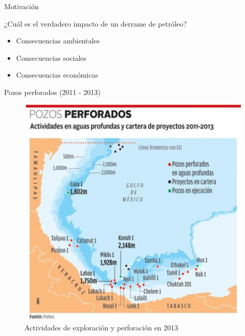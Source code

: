 \begin{frame}{Motivación}
  \begin{block}{¿Cuál es el verdadero impacto de un derrame de petróleo?}
    \begin{itemize}
      \item Consecuencias ambientales
      \item Consecuencias sociales
      \item Consecuencias económicas
    \end{itemize}
  \end{block}

\end{frame}

\begin{frame}{Pozos perforados (2011 - 2013)}
    \begin{figure}
        \centering
        \includegraphics[scale=0.4]{img/section_01/pozos_perforados_2013.jpg}
        \caption{Actividades de exploración y perforación en 2013}
        \label{fig:section_01_pozos}
    \end{figure}
\end{frame}

